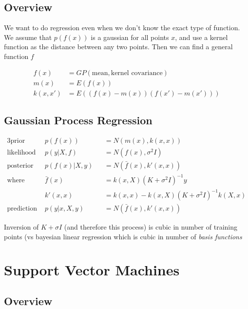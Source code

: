 \documentclass[]{article}
\theoremstyle{definition}
\begin{document}
\subsection{Overview}

We want to do regression even when we don't know the exact type of function. We assume that $p(f(x))$ 
is a gaussian for all points $x$, and use a kernel function as the distance between any two points. Then we
can find a general function $f$

\begin{align*}
    f(x) &= GP(\text{mean}, \text{kernel covariance}) \\
    m(x) &= E(f(x)) \\
    k(x, x') &= E((f(x) - m(x))(f(x') - m(x')))
\end{align*}

\subsection{Gaussian Process Regression}
\label{sub:gaussian_process_regression}

\begin{alignat*}{3}
    \text{prior }& p(f(x)) &&= N(m(x), k(x,x)) \\
    \text{likelihood }& p(y | X, f) &&= N(f(x), \sigma^2 I) \\
    \text{posterior }& p(f(x) | X, y) &&= N(\bar f(x), k'(x, x)) \\
    \text{where } & \bar f(x) &&= k(x, X) ( K + \sigma^2 I )^{-1} y \\
                  & k'(x, x) &&= k(x, x) - k(x, X) ( K + \sigma^2 I )^{-1} k (X, x) \\
    \text{prediction } & p(y | x, X, y) &&= N(\bar f(x), k'(x, x))
\end{alignat*}

Inversion of $K + \sigma I$ (and therefore this process) is cubic in number of training points
(vs bayesian linear regression which is cubic in number of \textit{basis functions}


\section{Support Vector Machines}
\label{sec:support_vector_machines}

\subsection{Overview}
\end{document}
